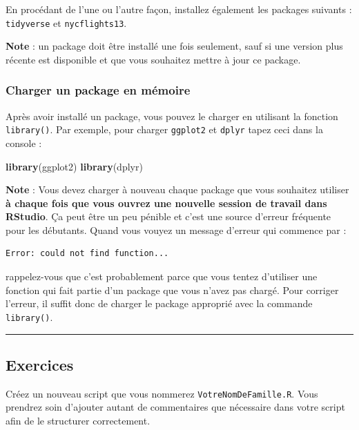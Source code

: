 \documentclass[
  a4paper,
]{article}
\newenvironment{Shaded}{\begin{snugshade}}{\end{snugshade}}
\newcommand{\KeywordTok}[1]{\textcolor[rgb]{0.12,0.11,0.11}{\textbf{#1}}}
\newcommand{\NormalTok}[1]{\textcolor[rgb]{0.12,0.11,0.11}{#1}}
\begin{document}
En procédant de l'une ou l'autre façon, installez également les packages suivants : \texttt{tidyverse} et \texttt{nycflights13}.

\textbf{Note} : un package doit être installé une fois seulement, sauf si une version plus récente est disponible et que vous souhaitez mettre à jour ce package.

\hypertarget{charger-un-package-en-muxe9moire}{%
\subsubsection{Charger un package en mémoire}\label{charger-un-package-en-muxe9moire}}

Après avoir installé un package, vous pouvez le charger en utilisant la fonction \texttt{library()}. Par exemple, pour charger \texttt{ggplot2} et \texttt{dplyr} tapez ceci dans la console :

\begin{Shaded}
\begin{Highlighting}[]
\KeywordTok{library}\NormalTok{(ggplot2)}
\KeywordTok{library}\NormalTok{(dplyr)}
\end{Highlighting}
\end{Shaded}

\textbf{Note} : Vous devez charger à nouveau chaque package que vous souhaitez utiliser \textbf{à chaque fois que vous ouvrez une nouvelle session de travail dans RStudio}. Ça peut être un peu pénible et c'est une source d'erreur fréquente pour les débutants. Quand vous vouyez un message d'erreur qui commence par :

\begin{verbatim}
Error: could not find function...
\end{verbatim}

rappelez-vous que c'est probablement parce que vous tentez d'utiliser une fonction qui fait partie d'un package que vous n'avez pas chargé. Pour corriger l'erreur, il suffit donc de charger le package approprié avec la commande \texttt{library()}.

\begin{center}\rule{0.5\linewidth}{0.5pt}\end{center}

\hypertarget{Exo-1}{%
\subsection{Exercices}\label{Exo-1}}

Créez un nouveau script que vous nommerez \texttt{VotreNomDeFamille.R}. Vous prendrez soin d'ajouter autant de commentaires que nécessaire dans votre script afin de le structurer correctement.
\end{document}
